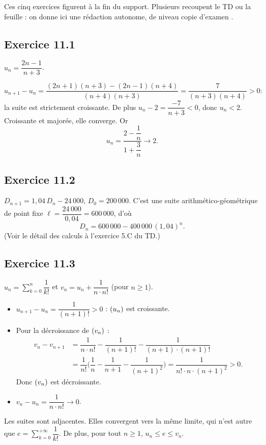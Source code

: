 \documentclass[11pt,a4paper]{article}
\begin{document}
Ces cinq exercices figurent à la fin du support. Plusieurs recoupent le TD ou la feuille : on donne ici une rédaction autonome, de niveau \og copie d'examen \fg{}.

\subsection{Exercice 11.1}

$u_n=\dfrac{2n-1}{n+3}$.

\[
u_{n+1}-u_n = \dfrac{(2n+1)(n+3)-(2n-1)(n+4)}{(n+4)(n+3)} = \dfrac{7}{(n+3)(n+4)}>0 :
\]
la suite est strictement croissante. De plus $u_n-2=\dfrac{-7}{n+3}<0$, donc $u_n<2$. Croissante et majorée, elle converge. Or
\[
u_n = \dfrac{2-\dfrac{1}{n}}{1+\dfrac{3}{n}}\to 2.
\]

\subsection{Exercice 11.2}

$D_{n+1}=1{,}04\, D_n-24\,000$, $D_0=200\,000$. C'est une suite arithmético-géométrique de point fixe $\ell=\dfrac{24\,000}{0{,}04}=600\,000$, d'où
\[
D_n = 600\,000 - 400\,000\,(1{,}04)^n.
\]
(Voir le détail des calculs à l'exercice 5.C du TD.)

\subsection{Exercice 11.3}

$u_n=\sum_{k=0}^n \dfrac{1}{k!}$ et $v_n=u_n+\dfrac{1}{n\cdot n!}$ (pour $n\geq 1$).

\begin{itemize}
  \item $u_{n+1}-u_n=\dfrac{1}{(n+1)!}>0$ : $(u_n)$ est croissante.
  \item Pour la décroissance de $(v_n)$ :
  \begin{align*}
  v_n-v_{n+1}
  &= \dfrac{1}{n\cdot n!} - \dfrac{1}{(n+1)!} - \dfrac{1}{(n+1)\cdot(n+1)!} \\
  &= \dfrac{1}{n!}\Biggl(\dfrac{1}{n}-\dfrac{1}{n+1}-\dfrac{1}{(n+1)^2}\Biggr)
  = \dfrac{1}{n!\cdot n\cdot (n+1)^2}>0.
  \end{align*}
  Donc $(v_n)$ est décroissante.
  \item $v_n-u_n=\dfrac{1}{n\cdot n!}\to 0$.
\end{itemize}
Les suites sont adjacentes. Elles convergent vers la même limite, qui n'est autre que $e=\sum_{k=0}^{+\infty}\dfrac{1}{k!}$. De plus, pour tout $n\geq 1$, $u_n \leq e \leq v_n$.
\end{document}
